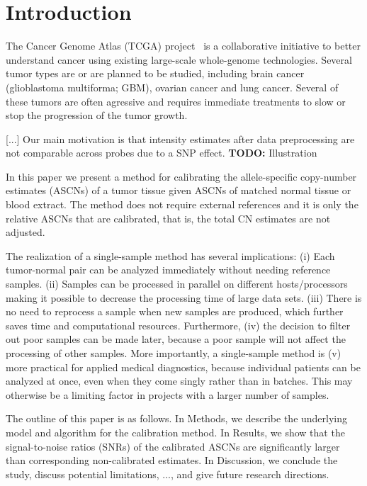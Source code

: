 \documentclass[draft]{bioinfo}
\newenvironment{TODO}{\color{red}\textbf{TODO:}}{}
\begin{document}
\section{Introduction}
\label{secBackground}

The Cancer Genome Atlas (TCGA) project~\citep{CollinsBarker_2007,TCGA_2008c} is a collaborative initiative to better understand cancer using existing large-scale whole-genome technologies.  Several tumor types are or are planned to be studied, including brain cancer (glioblastoma multiforma; GBM), ovarian cancer and lung cancer.  Several of these tumors are often agressive and requires immediate treatments to slow or stop the progression of the tumor growth.

[...]
Our main motivation is that intensity estimates after data preprocessing are not comparable across probes due to a SNP effect.
\begin{TODO}
  Illustration
\end{TODO}


In this paper we present a method for calibrating the allele-specific copy-number estimates (ASCNs) of a tumor tissue given ASCNs of matched normal tissue or blood extract.  The method does not require external references and it is only the relative ASCNs that are calibrated, that is, the total CN estimates are not adjusted.

The realization of a single-sample method has several implications:
(i) Each tumor-normal pair can be analyzed immediately without needing reference samples.
(ii) Samples can be processed in parallel on different hosts/processors making it possible to decrease the processing time of large data sets.
(iii) There is no need to reprocess a sample when new samples are produced, which further saves time and computational resources.
Furthermore, (iv) the decision to filter out poor samples can be made later, because a poor sample will not affect the processing of other samples.
More importantly, a single-sample method is
(v) more practical for applied medical diagnostics, because individual patients can be analyzed at once, even when they come singly rather than in batches.  This may otherwise be a limiting factor in projects with a larger number of samples.

The outline of this paper is as follows. 
In Methods, we describe the underlying model and algorithm for the calibration method.
In Results, we show that the signal-to-noise ratios (SNRs) of the calibrated ASCNs are significantly larger than corresponding non-calibrated estimates.
In Discussion, we conclude the study, discuss potential limitations, ..., and give future research directions.
\end{document}
